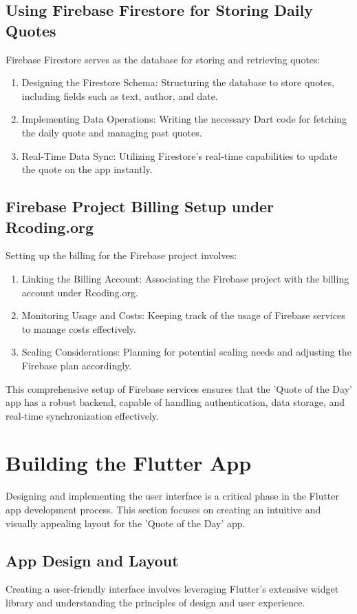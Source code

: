 \documentclass{book}
\begin{document}
\subsection{Using Firebase Firestore for Storing Daily Quotes}
Firebase Firestore serves as the database for storing and retrieving quotes:
\begin{enumerate}
    \item Designing the Firestore Schema: Structuring the database to store quotes, including fields such as text, author, and date.
    \item Implementing Data Operations: Writing the necessary Dart code for fetching the daily quote and managing past quotes.
    \item Real-Time Data Sync: Utilizing Firestore's real-time capabilities to update the quote on the app instantly.
\end{enumerate}

\subsection{Firebase Project Billing Setup under Rcoding.org}
Setting up the billing for the Firebase project involves:
\begin{enumerate}
    \item Linking the Billing Account: Associating the Firebase project with the billing account under Rcoding.org.
    \item Monitoring Usage and Costs: Keeping track of the usage of Firebase services to manage costs effectively.
    \item Scaling Considerations: Planning for potential scaling needs and adjusting the Firebase plan accordingly.
\end{enumerate}

This comprehensive setup of Firebase services ensures that the 'Quote of the Day' app has a robust backend, capable of handling authentication, data storage, and real-time synchronization effectively.

\section{Building the Flutter App}
Designing and implementing the user interface is a critical phase in the Flutter app development process. This section focuses on creating an intuitive and visually appealing layout for the 'Quote of the Day' app.

\subsection{App Design and Layout}
Creating a user-friendly interface involves leveraging Flutter's extensive widget library and understanding the principles of design and user experience.
\end{document}
